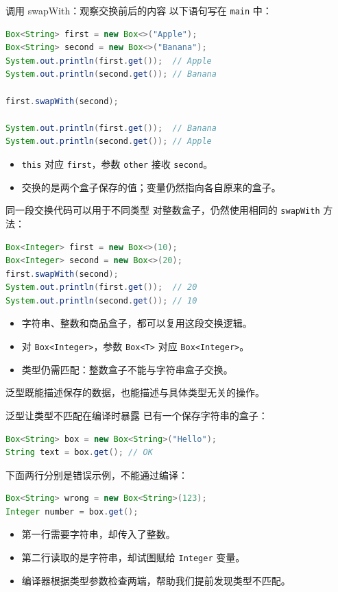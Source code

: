 \documentclass[aspectratio=169]{beamer}
\begin{document}
\begin{frame}[fragile]{调用 swapWith：观察交换前后的内容}
  以下语句写在 \texttt{main} 中：
  \begin{lstlisting}[language=Java]
Box<String> first = new Box<>("Apple");
Box<String> second = new Box<>("Banana");
System.out.println(first.get());  // Apple
System.out.println(second.get()); // Banana

first.swapWith(second);

System.out.println(first.get());  // Banana
System.out.println(second.get()); // Apple
  \end{lstlisting}
  \begin{itemize}
    \item \texttt{this} 对应 \texttt{first}，参数 \texttt{other} 接收 \texttt{second}。
    \item 交换的是两个盒子保存的值；变量仍然指向各自原来的盒子。
  \end{itemize}
\end{frame}

\begin{frame}[fragile]{同一段交换代码可以用于不同类型}
  对整数盒子，仍然使用相同的 \texttt{swapWith} 方法：
  \begin{lstlisting}[language=Java]
Box<Integer> first = new Box<>(10);
Box<Integer> second = new Box<>(20);
first.swapWith(second);
System.out.println(first.get());  // 20
System.out.println(second.get()); // 10
  \end{lstlisting}
  \begin{itemize}
    \item 字符串、整数和商品盒子，都可以复用这段交换逻辑。
    \item 对 \texttt{Box<Integer>}，参数 \texttt{Box<T>} 对应 \texttt{Box<Integer>}。
    \item 类型仍需匹配：整数盒子不能与字符串盒子交换。
  \end{itemize}
  \medskip
  \alert{泛型既能描述保存的数据，也能描述与具体类型无关的操作。}
\end{frame}

\begin{frame}[fragile]{泛型让类型不匹配在编译时暴露}
  已有一个保存字符串的盒子：
  \begin{lstlisting}[language=Java]
Box<String> box = new Box<String>("Hello");
String text = box.get(); // OK
  \end{lstlisting}
  下面两行分别是错误示例，\alert{不能通过编译}：
  \begin{lstlisting}[language=Java]
Box<String> wrong = new Box<String>(123);
Integer number = box.get();
  \end{lstlisting}
  \begin{itemize}
    \item 第一行需要字符串，却传入了整数。
    \item 第二行读取的是字符串，却试图赋给 \texttt{Integer} 变量。
    \item 编译器根据类型参数检查两端，帮助我们提前发现类型不匹配。
  \end{itemize}
\end{frame}
\end{document}

